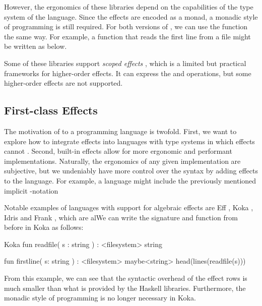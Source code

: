 However, the ergonomics of these libraries depend on the capabilities of the type system of the language. Since the effects are encoded as a monad, a monadic style of programming is still required. For both versions of , we can use the function the same way. For example, a function that reads the first line from a file might be written as below.

Some of these libraries support \emph{scoped effects} \autocite{wu_effect_2014}, which is a limited but practical frameworks for higher-order effects. It can express the \olocal and \ocatch operations, but some higher-order effects are not supported.

\subsection{First-class Effects}

The motivation of  to a programming language is twofold. First, we want to explore how to integrate effects into languages with type systems in which effects cannot . Second, built-in effects allow for more ergonomic and performant implementations. Naturally, the ergonomics of any given implementation are subjective, but we undeniably have more control over the syntax by adding effects to the language. For example, a language might include the previously mentioned implicit -notation

Notable examples of languages with support for algebraic effects are Eff \autocite{bauer_programming_2015}, Koka \autocite{leijen_koka_2014}, Idris \autocite{brady_programming_2013} and Frank \autocite{lindley_be_2017}, which are alWe can write the  signature and  function from before in Koka as follows:
\begin{lst}{Koka}
fun readfile( s : string ) : <filesystem>  string

fun firstline( s: string ) : <filesystem> maybe<string>
    head(lines(readfile(s)))
\end{lst}
From this example, we can see that the syntactic overhead of the effect rows is much smaller than what is provided by the Haskell libraries. Furthermore, the monadic style of programming is no longer necessary in Koka.

